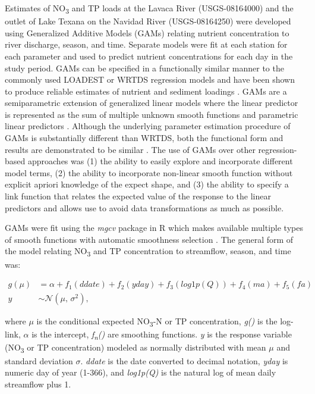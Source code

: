 \documentclass[water,article,submit,oneauthor]{Definitions/mdpi}
\begin{document}
Estimates of NO\textsubscript{3} and TP loads at the Lavaca River
(USGS-08164000) and the outlet of Lake Texana on the Navidad River
(USGS-08164250) were developed using Generalized Additive Models (GAMs)
relating nutrient concentration to river discharge, season, and time.
Separate models were fit at each station for each parameter and used to
predict nutrient concentrations for each day in the study period. GAMs
can be specified in a functionally similar manner to the commonly used
LOADEST \citep{cohn_validity_1992} or WRTDS \citep{hirsch_weighted_2010}
regression models and have been shown to produce reliable estimates of
nutrient and sediment loadings
\citep{wangLoadEstimationUncertainties2011, kroonRiverLoadsSuspended2012, kuhnert_quantifying_2012, robson_prediction_2015-1, hagemannEstimatingNutrientOrganic2016, mcdowell_implications_2021, biagi_novel_2022}.
GAMs are a semiparametric extension of generalized linear models where
the linear predictor is represented as the sum of multiple unknown
smooth functions and parametric linear predictors
\citep{wood_fast_2011}. Although the underlying parameter estimation
procedure of GAMs is substantially different than WRTDS, both the
functional form and results are demonstrated to be similar
\citep{beckNumericalQualitativeContrasts2017}. The use of GAMs over
other regression-based approaches was (1) the ability to easily explore
and incorporate different model terms, (2) the ability to incorporate
non-linear smooth function without explicit apriori knowledge of the
expect shape, and (3) the ability to specify a link function that
relates the expected value of the response to the linear predictors and
allows use to avoid data transformations as much as possible.

GAMs were fit using the \emph{mgcv} package in R which makes available
multiple types of smooth functions with automatic smoothness selection
\citep{wood_fast_2011}. The general form of the model relating
NO\textsubscript{3} and TP concentration to streamflow, season, and time
was:

\begin{equation}\label{eq:1}
\begin{aligned}
g(\mu) &= \alpha + f_1(ddate) + f_2(yday) + f_3(log1p(Q)) + f_4(ma) + f_5(fa)  \\
y &\sim \mathcal{N}(\mu,\,\sigma^{2}),
\end{aligned}
\end{equation}

where \(\mu\) is the conditional expected NO\textsubscript{3}-N or TP
concentration, \emph{g()} is the log-link, \(\alpha\) is the intercept,
\emph{f\textsubscript{n}()} are smoothing functions. \emph{y} is the
response variable (NO\textsubscript{3} or TP concentration) modeled as
normally distributed with mean \(\mu\) and standard deviation
\(\sigma\). \emph{ddate} is the date converted to decimal notation,
\emph{yday} is numeric day of year (1-366), and \emph{log1p(Q)} is the
natural log of mean daily streamflow plus 1.
\end{document}

